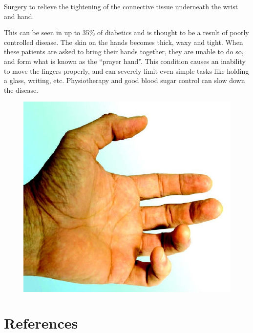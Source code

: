  \item Surgery to relieve the tightening of the connective tissue underneath the wrist and hand.


This can be seen in up to 35\% of diabetics and is thought to be a result of poorly controlled disease. The skin on the hands becomes thick, waxy and tight. When these patients are asked to bring their hands together, they are unable to do so, and form what is known as the “prayer hand”. This condition causes an inability to move the fingers properly, and can severely limit even simple tasks like holding a glass, writing, etc. Physiotherapy and good blood sugar control can slow down the disease.

\begin{figure}
\includegraphics{images/075.jpg}
\end{figure}


\section*{References}

